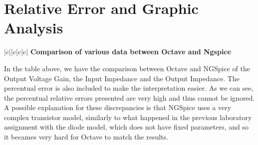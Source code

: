 \section{Relative Error and Graphic Analysis}
\label{sec:erroranalysis}

\begin{center}
   \begin{tabular}{|c||c|c|c|}
      \hline    
       {\bf Comparison of various data between Octave and Ngspice} \\
      \hline
        
   \end{tabular}
\end{center}

\par In the table above, we have the comparison between Octave and NGSpice of the Output Voltage Gain, the Input Impedance and the Output Impedance. The percentual error is also included to make the interpretation easier. As we can see, the percentual relative errors presented are very high and thus cannot be ignored. A possible explanation for these discrepancies is that NGSpice uses a very complex transistor model, similarly to what happened in the previous laboratory assignment with the diode model, which does not have fixed parameters, and so it becames very hard for Octave to match the results.
